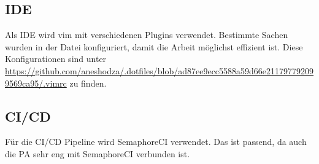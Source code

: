 \subsection{IDE}
Als IDE wird vim mit verschiedenen Plugins verwendet. Bestimmte Sachen wurden in der  Datei
konfiguriert, damit die Arbeit möglichst effizient ist. \newline
Diese Konfigurationen sind unter \newline
\url{https://github.com/aneshodza/.dotfiles/blob/ad87ee9ecc5588a59d66e211797792099569ca95/.vimrc} zu finden.
\subsection{CI/CD}
Für die CI/CD Pipeline wird SemaphoreCI verwendet. Das ist passend, da auch die PA sehr eng mit SemaphoreCI verbunden
ist.
